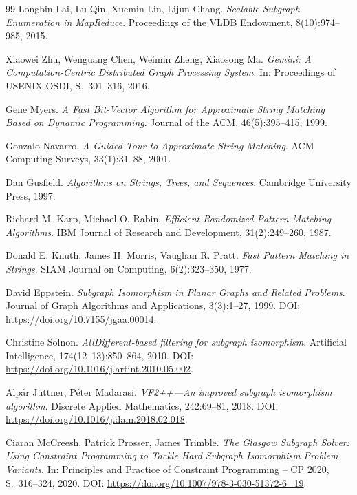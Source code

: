 \documentclass[a4paper,12pt, twoside]{report}
\theoremstyle{definition}
\begin{document}
\begin{thebibliography}{99}
Longbin Lai, Lu Qin, Xuemin Lin, Lijun Chang.
\emph{Scalable Subgraph Enumeration in MapReduce}.
Proceedings of the VLDB Endowment, 8(10):974--985, 2015.

Xiaowei Zhu, Wenguang Chen, Weimin Zheng, Xiaosong Ma.
\emph{Gemini: A Computation-Centric Distributed Graph Processing System}.
In: Proceedings of USENIX OSDI, S.~301--316, 2016.


Gene Myers.
\emph{A Fast Bit-Vector Algorithm for Approximate String Matching Based on Dynamic Programming}.
Journal of the ACM, 46(5):395--415, 1999.

Gonzalo Navarro.
\emph{A Guided Tour to Approximate String Matching}.
ACM Computing Surveys, 33(1):31--88, 2001.

Dan Gusfield.
\emph{Algorithms on Strings, Trees, and Sequences}.
Cambridge University Press, 1997.

Richard M. Karp, Michael O. Rabin.
\emph{Efficient Randomized Pattern-Matching Algorithms}.
IBM Journal of Research and Development, 31(2):249--260, 1987.

Donald E. Knuth, James H. Morris, Vaughan R. Pratt.
\emph{Fast Pattern Matching in Strings}.
SIAM Journal on Computing, 6(2):323--350, 1977.


David Eppstein.
\emph{Subgraph Isomorphism in Planar Graphs and Related Problems}.
Journal of Graph Algorithms and Applications, 3(3):1--27, 1999.
DOI: \url{https://doi.org/10.7155/jgaa.00014}.

Christine Solnon.
\emph{AllDifferent-based filtering for subgraph isomorphism}.
Artificial Intelligence, 174(12--13):850--864, 2010.
DOI: \url{https://doi.org/10.1016/j.artint.2010.05.002}.

Alp\'ar J\"uttner, P\'eter Madarasi.
\emph{VF2++---An improved subgraph isomorphism algorithm}.
Discrete Applied Mathematics, 242:69--81, 2018.
DOI: \url{https://doi.org/10.1016/j.dam.2018.02.018}.

Ciaran McCreesh, Patrick Prosser, James Trimble.
\emph{The Glasgow Subgraph Solver: Using Constraint Programming to Tackle Hard Subgraph Isomorphism Problem Variants}.
In: Principles and Practice of Constraint Programming -- CP 2020, S.~316--324, 2020.
DOI: \url{https://doi.org/10.1007/978-3-030-51372-6_19}.


\end{thebibliography}
\end{document}
